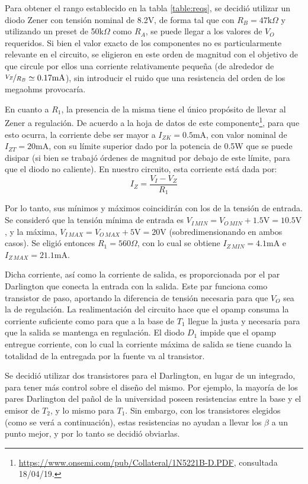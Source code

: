 \documentclass[e2_tp1_main.tex]{subfiles}
\begin{document}
Para obtener el rango establecido en la tabla \ref{table:reqs}, se decidi\'o utilizar un diodo Zener con tensi\'on nominal de 8.2V, de forma tal que con $R_B=47\mathrm{k}\Omega$ y utilizando un preset de 50k$\Omega$ como $R_A$, se puede llegar a los valores de $V_O$ requeridos. Si bien el valor exacto de los componentes no es particularmente relevante en el circuito, se eligieron en este orden de magnitud con el objetivo de que circule por ellos una corriente relativamente peque\~na (de alrededor de $\nicefrac{V_Z}{R_B}\simeq 0.17\mathrm{mA}$), sin introducir el ruido que una resistencia del orden de los megaohms provocar\'ia.

En cuanto a $R_1$, la presencia de la misma tiene el \'unico prop\'osito de llevar al Zener a regulaci\'on. De acuerdo a la hoja de datos de este componente\footnote{
\url{https://www.onsemi.com/pub/Collateral/1N5221B-D.PDF}, consultada 18/04/19. 
}, para que esto ocurra, la corriente debe ser mayor a $I_{ZK}=0.5$mA, con valor nominal de $I_{ZT}=20$mA, con su l\'imite superior dado por la potencia de 0.5W que se puede disipar (si bien se trabaj\'o \'ordenes de magnitud por debajo de este l\'imite, para que el diodo no caliente). En nuestro circuito, esta corriente est\'a dada por:
\[I_Z= \frac{V_{I} - V_{Z}}{R_1} \]

Por lo tanto, sus m\'inimos y m\'aximos coincidir\'an con los de la tensi\'on de entrada. Se consider\'o que la tensi\'on m\'inima de entrada es $V_{I\, MIN} = V_{O\, MIN} + 1.5\mathrm{V} = 10.5\mathrm{V}$, y la m\'axima,  $V_{I\, MAX} = V_{O\, MAX} + 5\mathrm{V} = 20\mathrm{V}$ (sobredimensionando en ambos casos). Se eligi\'o entonces $R_1=560\Omega$, con lo cual se obtiene $I_{Z\, MIN} = 4.1$mA e $I_{Z\, MAX} = 21.1$mA.

Dicha corriente, as\'i como la corriente de salida, es proporcionada por el par Darlington que conecta la entrada con la salida. Este par funciona como transistor de paso, aportando la diferencia de tensi\'on necesaria para que $V_{O}$ sea la de regulaci\'on. La realimentaci\'on del circuito hace que el opamp consuma la corriente suficiente como para que a la base de $T_1$ llegue la justa y necesaria para que la salida se mantenga en regulaci\'on. El diodo $D_1$ impide que el opamp entregue corriente, con lo cual la corriente m\'axima de salida se tiene cuando la totalidad de la entregada por la fuente va al transistor. 

Se decidi\'o utilizar dos transistores para el Darlington, en lugar de un integrado, para tener m\'as control sobre el dise\~no del mismo. Por ejemplo, la mayor\'ia de los pares Darlington del pa\~nol de la universidad poseen resistencias entre la base y el emisor de $T_2$, y lo mismo para $T_1$. Sin embargo, con los transistores elegidos (como se ver\'a a continuaci\'on), estas resistencias no ayudan a llevar los $\beta$ a un punto mejor, y por lo tanto se decidi\'o obviarlas.
\end{document}
